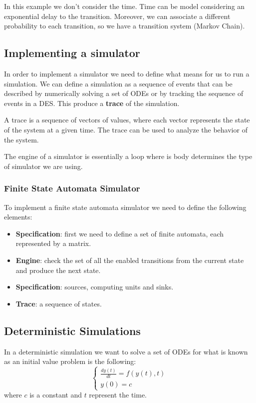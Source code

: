 In this example we don't consider the time. Time can be model considering an
exponential delay to the transition. Moreover, we can associate a different
probability to each transition, so we have a transition system (Markov Chain).
\subsection{Implementing a simulator}
In order to implement a simulator we need to define what means for us to run a
simulation. We can define a simulation as a sequence of events that can be
described by numerically solving a set of ODEs or by tracking the sequence of
events in a DES. This produce a \textbf{trace} of the simulation.

A trace is a sequence of vectors of values, where each vector represents the
state of the system at a given time. The trace can be used to analyze the
behavior of the system.

The engine of a simulator is essentially a loop where is body determines the
type of simulator we are using.
\subsubsection{Finite State Automata Simulator}
To implement a finite state automata simulator we need to define the following
elements:
\begin{itemize}
    \item \textbf{Specification}: first we need to define a set of finite
          automata, each represented by a matrix.
    \item \textbf{Engine}: check the set of all the enabled transitions from the
          current state and produce the next state.
    \item \textbf{Specification}: sources, computing units and sinks.
    \item \textbf{Trace}: a sequence of states.
\end{itemize}
\subsection{Deterministic Simulations}
In a deterministic simulation we want to solve a set of ODEs for what is known
as an initial value problem is the following:
\begin{equation}
    \begin{cases}
        \frac{dy(t)}{dt} = f(y(t), t) \\
        y(0) = c
    \end{cases}
\end{equation}
where $c$ is a constant and $t$ represent the time.

